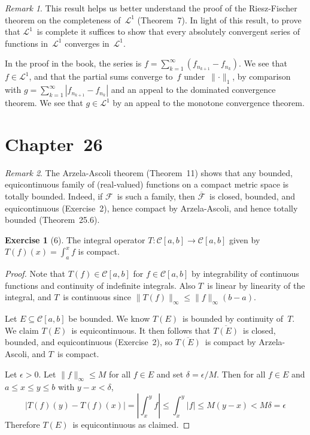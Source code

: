 \documentclass[letterpaper,12pt]{article}
\renewcommand{\L}{\mathcal{L}}
\newcommand{\C}{\mathcal{C}}
\newcommand{\F}{\mathcal{F}}
\newcommand{\abs}[1]{|{#1}|}
\newcommand{\bigabs}[1]{\left|{#1}\right|}
\newcommand{\norm}[1]{\lVert{#1}\rVert}
\newcommand{\supnorm}[1]{\norm{#1}_{\infty}}
\newcommand{\closure}[1]{\overline{#1}}
\theoremstyle{plain}
\theoremstyle{definition}
\newtheorem*{exer}{Exercise}
\theoremstyle{remark}
\newtheorem*{rmk}{Remark}
\begin{document}
\begin{rmk}
This result helps us better understand the proof of the Riesz-Fischer theorem on the completeness of~\(\L^1\) (Theorem~7). In light of this result, to prove that \(\L^1\)~is complete it suffices to show that every absolutely convergent series of functions in~\(\L^1\) converges in~\(\L^1\).

In the proof in the book, the series is \(f=\sum_{k=1}^{\infty}(f_{n_{k+1}}-f_{n_k})\). We see that \(f\in\L^1\), and that the partial sums converge to~\(f\) under~\(\norm{\cdot}_1\), by comparison with \(g=\sum_{k=1}^{\infty}\abs{f_{n_{k+1}}-f_{n_k}}\) and an appeal to the dominated convergence theorem. We see that \(g\in\L^1\) by an appeal to the monotone convergence theorem.
\end{rmk}

\section*{Chapter~26}
\begin{rmk}
The Arzela-Ascoli theorem (Theorem~11) shows that any bounded, equicontinuous family of (real-valued) functions on a compact metric space is totally bounded. Indeed, if \(\F\)~is such a family, then \(\closure{\F}\)~is closed, bounded, and equicontinuous (Exercise~2), hence compact by Arzela-Ascoli, and hence totally bounded (Theorem~25.6).
\end{rmk}

\begin{exer}[6]
The integral operator \(T:\C[a,b]\to\C[a,b]\) given by \(T(f)(x)=\int_a^x f\) is compact.
\end{exer}
\begin{proof}
Note that \(T(f)\in\C[a,b]\) for \(f\in\C[a,b]\) by integrability of continuous functions and continuity of indefinite integrals. Also \(T\)~is linear by linearity of the integral, and \(T\)~is continuous since \(\supnorm{T(f)}\le\supnorm{f}(b-a)\).

Let \(E\subseteq\C[a,b]\) be bounded. We know \(T(E)\)~is bounded by continuity of~\(T\). We claim \(T(E)\)~is equicontinuous. It then follows that \(\closure{T(E)}\)~is closed, bounded, and equicontinuous (Exercise~2), so \(\closure{T(E)}\)~is compact by Arzela-Ascoli, and \(T\)~is compact.

Let \(\epsilon>0\). Let \(\supnorm{f}\le M\) for all \(f\in E\) and set \(\delta=\epsilon/M\). Then for all \(f\in E\) and \(a\le x\le y\le b\) with \(y-x<\delta\),
\[\abs{T(f)(y)-T(f)(x)}=\bigabs{\int_x^yf}\le\int_x^y\abs{f}\le M(y-x)<M\delta=\epsilon\]
Therefore \(T(E)\)~is equicontinuous as claimed.
\end{proof}
\end{document}
